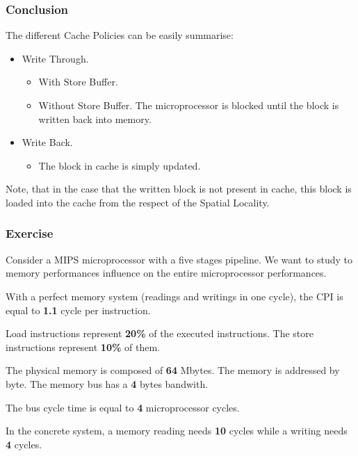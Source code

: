 \begin{frame}
  \frametitle{Conclusion}

  The different Cache Policies can be easily summarise:

  \begin{itemize}
    \item
      Write Through.

      \begin{itemize}
	\item
	  With Store Buffer.
	\item
	  Without Store Buffer. The microprocessor is blocked until the
	  block is written back into memory.
      \end{itemize}

    \item
      Write Back.

      \begin{itemize}
	\item
	  The block in cache is simply updated.
      \end{itemize}
  \end{itemize}

  Note, that in the case that the written block is not present in cache,
  this block is loaded into the cache from the respect of the Spatial
  Locality.
\end{frame}


\begin{frame}
  \frametitle{Exercise}

  Consider a MIPS microprocessor with a five stages pipeline. We want to
  study to memory performances influence on the entire microprocessor
  performances.

  \-

  With a perfect memory system (readings and writings in one cycle),
  the CPI is equal to \textbf{1.1} cycle per instruction.

  \-

  Load instructions represent \textbf{20\%} of the executed instructions.
  The store instructions represent \textbf{10\%} of them.

  \-

  The physical memory is composed of \textbf{64} Mbytes. The memory
  is addressed by byte. The memory bus has a \textbf{4} bytes bandwith.

  \-

  The bus cycle time is equal to \textbf{4} microprocessor cycles.

  \-

  In the concrete system, a memory reading needs \textbf{10} cycles while
  a writing needs \textbf{4} cycles.
\end{frame}

